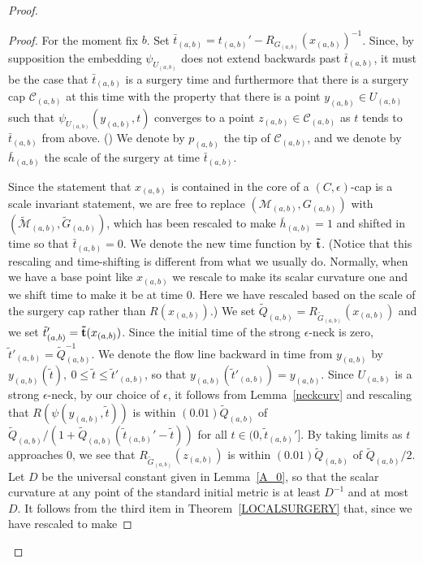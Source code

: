 \begin{proof}
\begin{proof}
For the moment fix $b$. Set $\bar
t_{(a,b)}=t_{(a,b)}'-R_{G_{(a,b)}}(x_{(a,b)})^{-1}$. Since, by supposition the
embedding $\psi_{U_{(a,b)}}$ does not extend  backwards past $\bar t_{(a,b)}$, it
must be the case that $\bar t_{(a,b)}$  is a surgery time and
furthermore that there is a surgery cap ${\mathcal C}_{(a,b)}$ at
this time with the property that there is a point $y_{(a,b)}\in
U_{(a,b)}$ such that $\psi_{U_{(a,b)}}(y_{(a,b)},t)$ converges to a
point $z_{(a,b)}\in {\mathcal C}_{(a,b)}$ as $t$ tends to $\bar
t_{(a,b)}$ from above. () We denote by
$p_{(a,b)}$ the tip of ${\mathcal C}_{(a,b)}$, and we denote by
$\bar h_{(a,b)}$ the scale of the surgery at time $\bar t_{(a,b)}$.



Since the statement that $x_{(a,b)}$ is contained in the core of a $(C,\epsilon)$-cap is
a scale invariant statement, we are free to replace $({\mathcal M}_{(a,b)},G_{(a,b)})$ with
$(\widetilde{\mathcal M}_{(a,b)},\widetilde G_{(a,b)})$, which has been rescaled to make
$\bar h_{(a,b)}=1$ and shifted in time so that $\bar t_{(a,b)}=0$. We denote the new time function
by ${\bf \tilde t}$.
(Notice that this rescaling and time-shifting is different from what we usually do.
Normally, when we have a base point like $x_{(a,b)}$ we rescale to make its scalar curvature one and
we shift time to make it be at time $0$. Here we have rescaled based on the scale of the surgery cap
rather than $R(x_{(a,b)})$.) We set $\tilde Q_{(a,b)}=R_{\widetilde G_{(a,b)}}(x_{(a,b)})$ and we set
$\tilde t'_{(a,b)}={\bf \tilde t}(x_{(a,b)})$. Since the initial time of the strong $\epsilon$-neck
is zero,  $\tilde t'_{(a,b)}=\tilde Q_{(a,b)}^{-1}$. We denote the flow line backward in time from
 $y_{(a,b)}$ by $y_{(a,b)}(\tilde t),\ 0\le \tilde t\le \tilde t'_{(a,b)}$, so that
 $y_{(a,b)}(\tilde t'_{(a,b)})=y_{(a,b)}$.
 Since $U_{(a,b)}$ is a strong $\epsilon$-neck, by our choice of $\epsilon$,
 it follows from Lemma~\ref{neckcurv} and rescaling that
 $R(\psi(y_{(a,b)},\tilde t))$ is within $(0.01) \tilde Q_{(a,b)}$ of
 $\tilde Q_{(a,b)}/(1+\tilde Q_{(a,b)}( \tilde t_{(a,b)}'-\tilde t))$ for all
 $t\in (0,\tilde t_{(a,b)}']$. By taking limits as $t$
 approaches $0$, we see that
  $R_{\widetilde G_{(a,b)}}(z_{(a,b)})$ is within $(0.01)\tilde Q_{(a,b)}$ of $\tilde Q_{(a,b)}/2$.
Let $D$ be the universal constant given in  Lemma~\ref{A_0}, so that
the scalar curvature at any point of the standard initial metric is
at least $D^{-1}$ and at most $D$.  It follows from the third item
in Theorem~\ref{LOCALSURGERY} that, since we have rescaled to make

\end{proof}
\end{proof}
